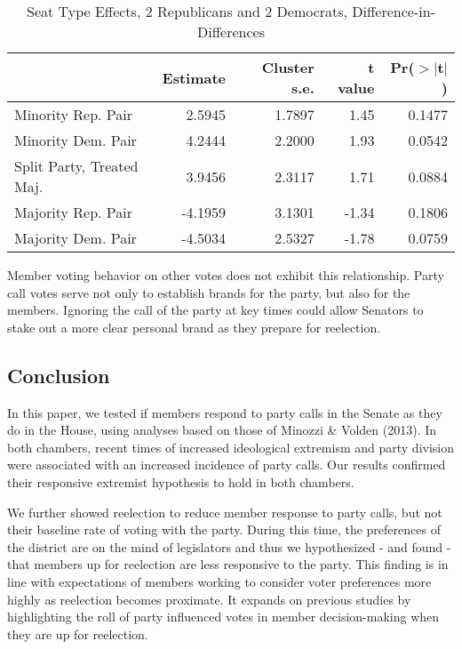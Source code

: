 \documentclass[12pt]{article}
\begin{document}
\begin{table}[H]
	\centering
	\singlespacing
	\caption{Seat Type Effects, 2 Republicans and 2 Democrats, Difference-in-Differences} 
	\begin{tabular}{lrrrr}
		\hline
		& Estimate & Cluster s.e. & t value & Pr($>$$|$t$|$) \\ 
		\hline
		Minority Rep. Pair & 2.5945 & 1.7897 & 1.45 & 0.1477 \\ 
		Minority Dem. Pair & 4.2444 & 2.2000 & 1.93 & 0.0542 \\ 
		Split Party, Treated Maj. & 3.9456 & 2.3117 & 1.71 & 0.0884 \\ 
		Majority Rep. Pair & -4.1959 & 3.1301 & -1.34 & 0.1806 \\ 
		Majority Dem. Pair & -4.5034 & 2.5327 & -1.78 & 0.0759 \\ 
		\hline
	\end{tabular}
\end{table}

Member voting behavior on other votes does not exhibit this relationship. Party call votes serve not only to establish brands for the party, but also for the members. Ignoring the call of the party at key times could allow Senators to stake out a more clear personal brand as they prepare for reelection. 

\subsection{Conclusion}

In this paper, we tested if members respond to party calls in the Senate as they do in the House, using analyses based on those of Minozzi \& Volden (2013). In both chambers, recent times of increased ideological extremism and party division were associated with an increased incidence of party calls. Our results confirmed their responsive extremist hypothesis to hold in both chambers. 

We further showed reelection to reduce member response to party calls, but not their baseline rate of voting with the party. During this time, the preferences of the district are on the mind of legislators and thus we hypothesized - and found - that members up for reelection are less responsive to the party. This finding is in line with expectations of members working to consider voter preferences more highly as reelection becomes proximate. It expands on previous studies by highlighting the roll of party influenced votes in member decision-making when they are up for reelection. 
\end{document}
